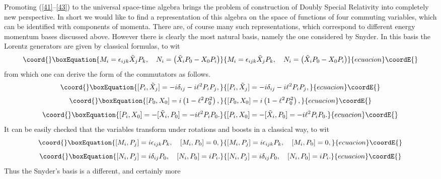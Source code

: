 \documentclass [prd,twocolumn,nofootinbib,showpacs]  {revtex4}
\begin{document}
Promoting (\ref{41}--\ref{43}) to the  universal space-time
algebra brings the problem of construction of  Doubly Special
Relativity into completely new perspective. In short we would like
to find a representation of this algebra on the space of functions
of four commuting variables, which can be identified with
components of momenta. There are, of course many such
representations, which correspond to different energy momentum
bases discussed above. However there is clearly the most natural
basis, namely the one considered by Snyder. In this basis the
Lorentz generators are given by classical formulas, to wit
\begin{equation}\coord{}\boxEquation{\label{44}
 M_i = \epsilon_{ijk}  \tilde{X}_j P_k , \quad N_i = \left( \tilde{X}_i P_0 - {X}_0 P_i\right)
}{M_i = \epsilon_{ijk}  \tilde{X}_j P_k , \quad N_i = \left( \tilde{X}_i P_0 - {X}_0 P_i\right)
}{ecuacion}\coordE{}\end{equation}
from which one can derive the form of the commutators \myHighlight{$[P_\mu, X_\nu]$}\coordHE{} as follows.
\begin{equation}\coord{}\boxEquation{\label{45}
 [P_i, \tilde{X}_j] = - i \delta_{ij} - i \ell^2 P_i P_j,
}{[P_i, \tilde{X}_j] = - i \delta_{ij} - i \ell^2 P_i P_j,
}{ecuacion}\coordE{}\end{equation}
\begin{equation}\coord{}\boxEquation{\label{46}
  [P_0, X_0] = i\left(1 - \ell^2 P_0^2\right),
}{[P_0, X_0] = i\left(1 - \ell^2 P_0^2\right),
}{ecuacion}\coordE{}\end{equation}
\begin{equation}\coord{}\boxEquation{\label{47}
 [P_i, X_0] = -[\tilde{X}_i, P_0] = - i \ell^2 P_i P_0.
}{[P_i, X_0] = -[\tilde{X}_i, P_0] = - i \ell^2 P_i P_0.
}{ecuacion}\coordE{}\end{equation}
It can be easily checked that the variables \coordHE{} transform under rotations and boosts in a classical way, to wit
\begin{equation}\coord{}\boxEquation{\label{48}
[M_i, P_j]= i\epsilon_{ijk}P_k, \quad [M_i, P_0]=0,
}{[M_i, P_j]= i\epsilon_{ijk}P_k, \quad [M_i, P_0]=0,
}{ecuacion}\coordE{}\end{equation}
\begin{equation}\coord{}\boxEquation{\label{49}
  [N_i, P_j]= i \delta_{ij}P_0, \quad [N_i, P_0]=i P_i.
}{[N_i, P_j]= i \delta_{ij}P_0, \quad [N_i, P_0]=i P_i.
}{ecuacion}\coordE{}\end{equation}
Thus the Snyder's basis is a different, and certainly more
\end{document}
